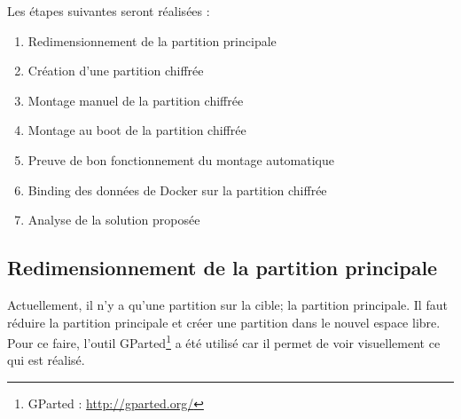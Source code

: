\documentclass[11pt,a4paper,oneside]{report}
\begin{document}
Les étapes suivantes seront réalisées :
\begin{enumerate}
\item Redimensionnement de la partition principale
\item Création d'une partition chiffrée
\item Montage manuel de la partition chiffrée
\item Montage au boot de la partition chiffrée
\item Preuve de bon fonctionnement du montage automatique
\item Binding des données de Docker sur la partition chiffrée
\item Analyse de la solution proposée
\end{enumerate}

\subsection{Redimensionnement de la partition principale}
Actuellement, il n'y a qu'une partition sur la cible; la partition principale. Il faut réduire la partition principale et créer une partition dans le nouvel espace libre. Pour ce faire, l'outil GParted\footnote{GParted : \url{http://gparted.org/}} a été utilisé car il permet de voir visuellement ce qui est réalisé.
\end{document}
